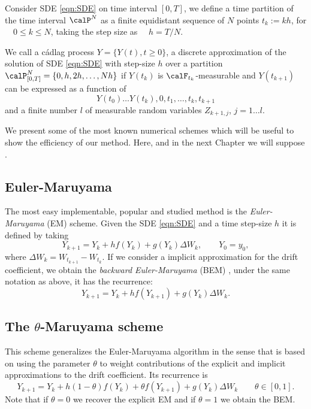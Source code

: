 	Consider SDE \eqref{eqn:SDE} on time interval $[0,T]$, we define a time
partition of the time interval $\calP^{N}$ as a finite equidistant sequence of $N$ points 
$t_k:=kh$, for $\quad 0\leq k\leq N$, taking the step size as $\quad h =T/N$.
\begin{definition}\label{dfn:ATD}
	We call a c\'adlag process $Y=\{Y(t),t\geq 0 \}$, a discrete approximation of the solution of SDE
	\eqref{eqn:SDE} with step-size $h$ over a partition 
	$\calP_{[0,T]}^N =\{0, h, 2h, \ldots, N h\} $ if $Y(t_k)$ is $\calF_{t_{k}}$-measurable and
	$Y(t_{k+1})$ can be expressed as a function of 
	$$Y(t_0)\ldots Y(t_k), 0,t_1, \ldots, t_k, t_{k+1}$$
	and a finite number $l$ of measurable random variables $Z_{k+1,j}$, $j=1\ldots l$.
\end{definition}
%
	We present some of the most known numerical  schemes which will be useful 
to show the efficiency of our method. Here, and in the next Chapter we will suppose 
.
\subsection*{Euler-Maruyama}
	The most easy implementable, popular and studied method is the \emph{Euler-Maruyama} (EM) scheme. Given the SDE 
	\eqref{eqn:SDE} and a 
	time step-size $h$ it is defined by taking  
	\begin{equation}\label{eqn:EulerMaruyama}
		Y_{k+1}= Y_k + h f(Y_k) + g(Y_k)\Delta W_k, \qquad Y_0=y_0,
	\end{equation}
	where $\Delta W_k =W_{t_{k+1}}-W_{t_k}$. 
	If we consider a implicit approximation for the drift coefficient, we obtain  the \emph{backward Euler-Maruyama}
	(BEM) \cite{Mao2013}, under the same notation as above, it has the recurrence:
	\begin{equation}\label{eqn:BackwardEM}
		Y_{k+1} = Y_k + h f(Y_{k+1}) + g(Y_k)\Delta W_k.
	\end{equation}
\subsection*{The $\theta$-Maruyama scheme}
		This scheme generalizes the Euler-Maruyama algorithm in the sense that is based on using the parameter $\theta$ 
	to weight contributions of the explicit and implicit approximations to the drift coefficient.  Its  recurrence 
	is  
	\begin{equation}\label{eqn:ThetaEM}
		Y_{k+1} = Y_k + h(1-\theta)f(Y_{k}) + 
		\theta f(Y_{k+1}) +
		g(Y_k)\Delta W_k \qquad \theta \in [0,1].
	\end{equation}
	Note that if $\theta = 0$ we recover the explicit EM and if $\theta = 1$ we obtain the BEM.
